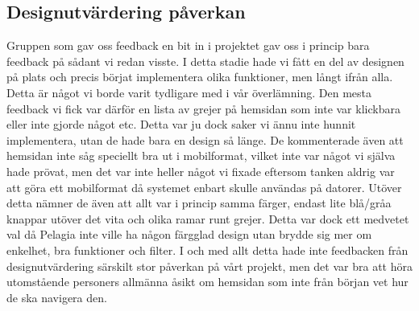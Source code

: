 \subsection{Designutvärdering påverkan}
Gruppen som gav oss feedback en bit in i projektet gav oss i princip bara feedback på sådant vi redan visste. I detta stadie hade vi fått en del av designen på plats och precis börjat implementera olika funktioner, men långt ifrån alla. Detta är något vi borde varit tydligare med i vår överlämning. Den mesta feedback vi fick var därför en lista av grejer på hemsidan som inte var klickbara eller inte gjorde något etc. Detta var ju dock saker vi ännu inte hunnit implementera, utan de hade bara en design så länge. De kommenterade även att hemsidan inte såg speciellt bra ut i mobilformat, vilket inte var något vi själva hade prövat, men det var inte heller något vi fixade eftersom tanken aldrig var att göra ett mobilformat då systemet enbart skulle användas på datorer. Utöver detta nämner de även att allt var i princip samma färger, endast lite blå/gråa knappar utöver det vita och olika ramar runt grejer. Detta var dock ett medvetet val då Pelagia inte ville ha någon färgglad design utan brydde sig mer om enkelhet, bra funktioner och filter. I och med allt detta hade inte feedbacken från designutvärdering särskilt stor påverkan på vårt projekt, men det var bra att höra utomstående personers allmänna åsikt om hemsidan som inte från början vet hur de ska navigera den.
